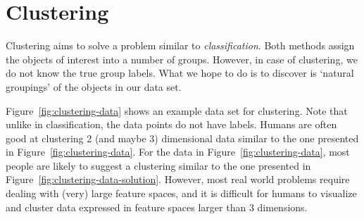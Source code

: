 \section{Clustering}

Clustering aims to solve a problem similar to \emph{classification}.
Both methods assign the objects of interest into a number of groups.
However, in case of clustering, we do not know the true group labels.
What we hope to do is to discover is `natural groupings' of the objects
in our data set.

Figure~\ref{fig:clustering-data} shows an example data set for clustering.
Note that unlike in classification,
the data points do not have labels.
Humans are often good at clustering
\num{2} (and maybe \num{3}) dimensional data similar to the one presented
in Figure~\ref{fig:clustering-data}.
For the data in Figure~\ref{fig:clustering-data},
most people are likely to suggest a clustering similar
to the one presented in Figure~\ref{fig:clustering-data-solution}.
However, most real world problems require dealing with (very) large 
feature spaces,
and it is difficult for humans to visualize and cluster
data expressed in feature spaces larger than \num{3} dimensions.

